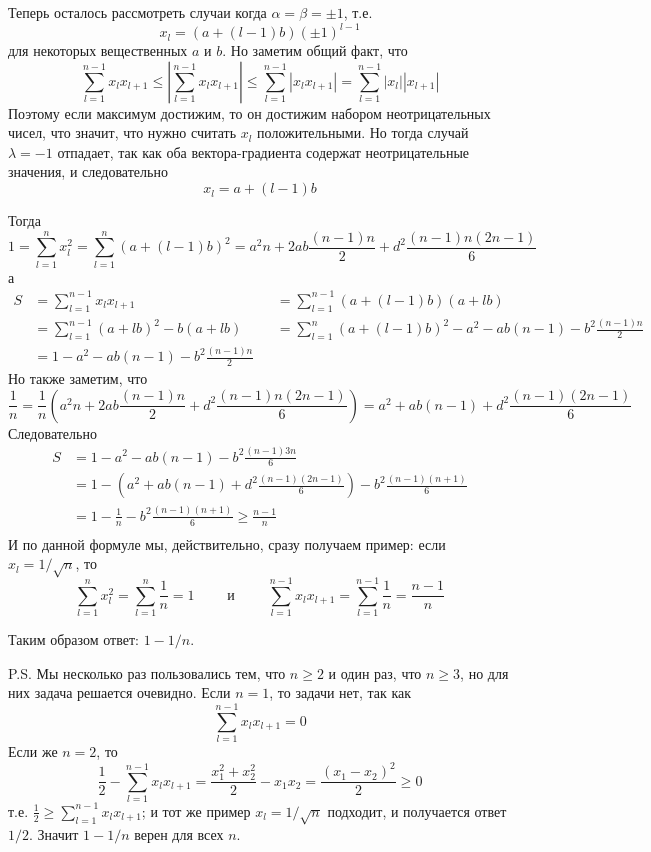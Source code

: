 \documentclass[12pt,a4paper]{article}
\begin{document}
\begin{enumproblem}
        Теперь осталось рассмотреть случаи когда $\alpha = \beta = \pm 1$, т.е.
        \[x_l = (a + (l-1)b) (\pm 1)^{l-1}\]
        для некоторых вещественных $a$ и $b$. Но заметим общий факт, что
        \[
            \sum_{l=1}^{n-1} x_l x_{l+1}
            \leqslant \left|\sum_{l=1}^{n-1} x_l x_{l+1}\right|
            \leqslant \sum_{l=1}^{n-1} |x_l x_{l+1}|
            = \sum_{l=1}^{n-1} |x_l| |x_{l+1}|
        \]
        Поэтому если максимум достижим, то он достижим набором неотрицательных чисел, что значит, что нужно считать $x_l$ положительными. Но тогда случай $\lambda = -1$ отпадает, так как оба вектора-градиента содержат неотрицательные значения, и следовательно
        \[x_l = a + (l-1)b\]

        Тогда
        \[
            1
            = \sum_{l=1}^n x_l^2
            = \sum_{l=1}^n (a + (l-1)b)^2
            = a^2 n + 2ab \frac{(n-1)n}{2} + d^2 \frac{(n-1)n(2n-1)}{6}
        \]
        а
        \begin{align*}
            S
            &= \sum_{l=1}^{n-1} x_l x_{l+1}&
            &= \sum_{l=1}^{n-1} (a + (l-1)b)(a + lb)\\
            &= \sum_{l=1}^{n-1} (a + lb)^2 - b(a + lb)&
            &= \sum_{l=1}^n (a + (l-1)b)^2 - a^2 - ab (n-1) - b^2 \frac{(n-1)n}{2}\\
            &= 1 - a^2 - ab (n-1) - b^2 \frac{(n-1)n}{2}&
        \end{align*}
        Но также заметим, что
        \[
            \frac{1}{n}
            = \frac{1}{n} \left(a^2 n + 2ab \frac{(n-1)n}{2} + d^2 \frac{(n-1)n(2n-1)}{6}\right)
            = a^2 + ab (n-1) + d^2 \frac{(n-1)(2n-1)}{6}
        \]
        Следовательно
        \begin{align*}
            S
            &= 1 - a^2 - ab (n-1) - b^2 \frac{(n-1)3n}{6}\\
            &= 1 - \left(a^2 + ab (n-1) + d^2 \frac{(n-1)(2n-1)}{6}\right) - b^2 \frac{(n-1)(n+1)}{6}\\
            &= 1 - \frac{1}{n} - b^2 \frac{(n-1)(n+1)}{6} \geqslant \frac{n-1}{n}\\
        \end{align*}
        И по данной формуле мы, действительно, сразу получаем пример: если $x_l = 1/\sqrt{n}$, то
        \[
            \sum_{l=1}^n x_l^2 = \sum_{l=1}^n \frac{1}{n} = 1
            \qquad \text{ и } \qquad
            \sum_{l=1}^{n-1} x_l x_{l+1} = \sum_{l=1}^{n-1} \frac{1}{n} = \frac{n-1}{n}
        \]

        Таким образом ответ: $1 - 1/n$.

        P.S. Мы несколько раз пользовались тем, что $n \geqslant 2$ и один раз, что $n \geqslant 3$, но для них задача решается очевидно. Если $n = 1$, то задачи нет, так как
        \[\sum_{l=1}^{n-1} x_l x_{l+1} = 0\]
        Если же $n = 2$, то
        \[
            \frac{1}{2} - \sum_{l=1}^{n-1} x_l x_{l+1}
            = \frac{x_1^2 + x_2^2}{2} - x_1x_2
            = \frac{(x_1 - x_2)^2}{2} \geqslant 0
        \]
        т.е. $\frac{1}{2} \geqslant \sum_{l=1}^{n-1} x_l x_{l+1}$; и тот же пример $x_l = 1/\sqrt{n}$ подходит, и получается ответ $1/2$. Значит $1 - 1/n$ верен для всех $n$.
    \end{enumproblem}
\end{document}

